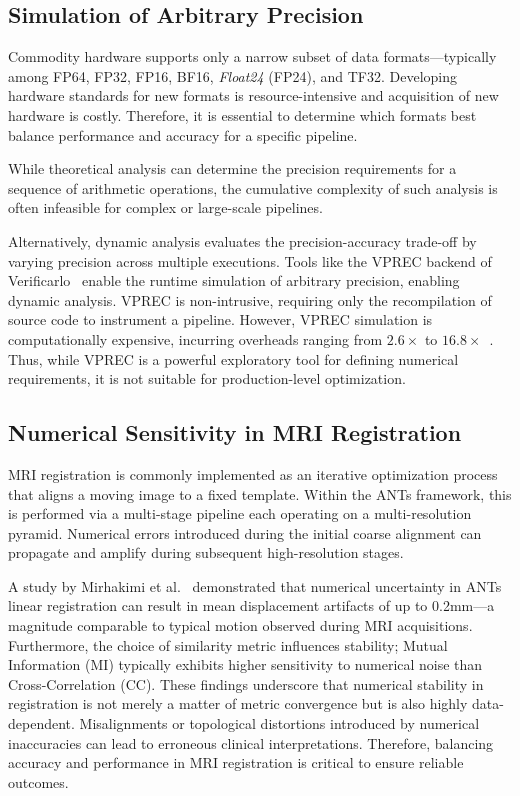 \documentclass[journal,twoside,web]{ieeecolor}
\begin{document}
\subsection{Simulation of Arbitrary Precision}
Commodity hardware supports only a narrow subset of data formats---typically among FP64, FP32, FP16, BF16, \textit{Float24} (FP24), and TF32. Developing hardware standards for new formats is resource-intensive and acquisition of new hardware is costly. Therefore, it is essential to determine which formats best balance performance and accuracy for a specific pipeline.

While theoretical analysis can determine the precision requirements for a sequence of arithmetic operations, the cumulative complexity of such analysis is often infeasible for complex or large-scale pipelines.

Alternatively, dynamic analysis evaluates the precision-accuracy trade-off by varying precision across multiple executions. Tools like the VPREC backend of Verificarlo~\cite{Denis2015-zf,Chatelain2019-vw} enable the runtime simulation of arbitrary precision, enabling dynamic analysis. VPREC is non-intrusive, requiring only the recompilation of source code to instrument a pipeline. However, VPREC simulation is computationally expensive, incurring overheads ranging from $2.6\times$ to $16.8\times$~\cite{Chatelain2019-vw}. Thus, while VPREC is a powerful exploratory tool for defining numerical requirements, it is not suitable for production-level optimization.

\subsection{Numerical Sensitivity in MRI Registration}
MRI registration is commonly implemented as an iterative optimization process that aligns a moving image to a fixed template. Within the ANTs framework, this is performed via a multi-stage pipeline each operating on a multi-resolution pyramid. Numerical errors introduced during the initial coarse alignment can propagate and amplify during subsequent high-resolution stages.

A study by Mirhakimi et al.~\cite{Mirhakimi2025-qb} demonstrated that numerical uncertainty in ANTs linear registration can result in mean displacement artifacts of up to 0.2mm---a magnitude comparable to typical motion observed during MRI acquisitions. Furthermore, the choice of similarity metric influences stability; Mutual Information (MI) typically exhibits higher sensitivity to numerical noise than Cross-Correlation (CC). These findings underscore that numerical stability in registration is not merely a matter of metric convergence but is also highly data-dependent. Misalignments or topological distortions introduced by numerical inaccuracies can lead to erroneous clinical interpretations. Therefore, balancing accuracy and performance in MRI registration is critical to ensure reliable outcomes.
\end{document}
